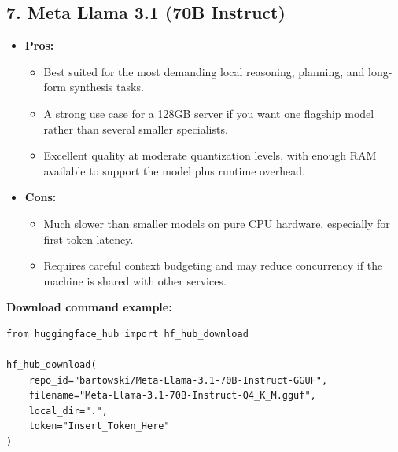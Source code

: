 \documentclass{article}
\begin{document}
\subsection*{7. Meta Llama 3.1 (70B Instruct)}
\begin{itemize}
    \item \textbf{Pros:}
    \begin{itemize}
        \item Best suited for the most demanding local reasoning, planning, and long-form synthesis tasks.
        \item A strong use case for a 128GB server if you want one flagship model rather than several smaller specialists.
        \item Excellent quality at moderate quantization levels, with enough RAM available to support the model plus runtime overhead.
    \end{itemize}
    \item \textbf{Cons:}
    \begin{itemize}
        \item Much slower than smaller models on pure CPU hardware, especially for first-token latency.
        \item Requires careful context budgeting and may reduce concurrency if the machine is shared with other services.
    \end{itemize}
\end{itemize}

\noindent\textbf{Download command example:}
\begin{verbatim}
from huggingface_hub import hf_hub_download

hf_hub_download(
    repo_id="bartowski/Meta-Llama-3.1-70B-Instruct-GGUF",
    filename="Meta-Llama-3.1-70B-Instruct-Q4_K_M.gguf",
    local_dir=".",
    token="Insert_Token_Here"
)
\end{verbatim}
\end{document}
